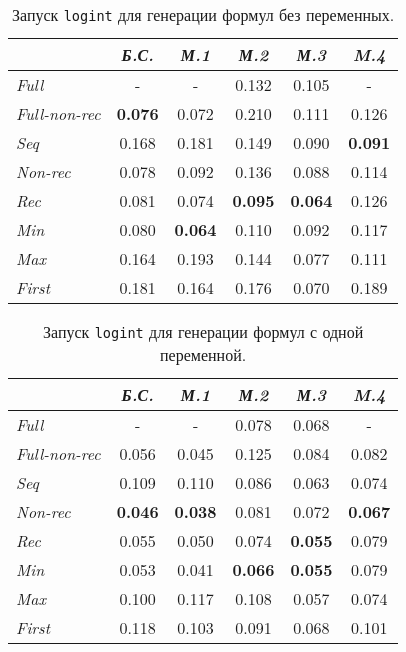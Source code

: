 \begin{table}[h!]
\center
\begin{tabular}{|l|c|c|c|c|c|}
\hline
   &{\it Б.С.}&{\it М.1}&{\it М.2}&{\it М.3}&{\it M.4} \\ \hline
{\it Full        } &    -        &    -         & 0.132      &  0.105       &    -   \\ \hline
{\it Full-non-rec} & {\bf 0.076} & 0.072       & 0.210       &  0.111       & 0.126 \\ \hline
{\it Seq         } & 0.168       & 0.181       & 0.149       &  0.090       & {\bf 0.091} \\ \hline
{\it Non-rec     } & 0.078       & 0.092       & 0.136       &  0.088       & 0.114 \\ \hline
{\it Rec         } & 0.081       & 0.074       & {\bf 0.095} &  {\bf 0.064} & 0.126 \\ \hline
{\it Min         } & 0.080       & {\bf 0.064} & 0.110      &  0.092       & 0.117 \\ \hline
{\it Max         } & 0.164       & 0.193       & 0.144       &  0.077       & 0.111 \\ \hline
{\it First       } & 0.181       & 0.164       & 0.176       &  0.070       & 0.189 \\ \hline
\end{tabular}
\caption{Запуск \lstinline{logint} для генерации формул без переменных.}
\label{fig:logintTest1}
\end{table}

\begin{table}[h!]
\center
\begin{tabular}{|l|c|c|c|c|c|}
\hline
   &{\it Б.С.}&{\it М.1}&{\it М.2}&{\it М.3}&{\it M.4} \\ \hline
{\it Full        }&    -         &     -        & 0.078       & 0.068 &    -  \\ \hline
{\it Full-non-rec}& 0.056        &  0.045       & 0.125       & 0.084 & 0.082 \\ \hline
{\it Seq         }& 0.109        &  0.110       & 0.086       & 0.063 & 0.074 \\ \hline
{\it Non-rec     }& {\bf 0.046}  &  {\bf 0.038} & 0.081       & 0.072 & {\bf 0.067} \\ \hline
{\it Rec         }& 0.055        &  0.050       & 0.074       & {\bf 0.055} & 0.079 \\ \hline
{\it Min         }& 0.053        &  0.041       & {\bf 0.066} & {\bf 0.055} & 0.079 \\ \hline
{\it Max         }& 0.100        &  0.117       & 0.108       & 0.057 & 0.074 \\ \hline
{\it First       }& 0.118        &  0.103       & 0.091       & 0.068 & 0.101 \\ \hline
\end{tabular}
\caption{Запуск \lstinline{logint} для генерации формул с одной переменной.}
\label{fig:logintTest2}
\end{table}

